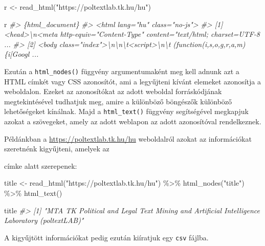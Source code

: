 \documentclass[
]{book}
\newenvironment{Shaded}{\begin{snugshade}}{\end{snugshade}}
\newcommand{\CommentTok}[1]{\textcolor[rgb]{0.56,0.35,0.01}{\textit{#1}}}
\newcommand{\FunctionTok}[1]{\textcolor[rgb]{0.00,0.00,0.00}{#1}}
\newcommand{\NormalTok}[1]{#1}
\newcommand{\OtherTok}[1]{\textcolor[rgb]{0.56,0.35,0.01}{#1}}
\newcommand{\SpecialCharTok}[1]{\textcolor[rgb]{0.00,0.00,0.00}{#1}}
\newcommand{\StringTok}[1]{\textcolor[rgb]{0.31,0.60,0.02}{#1}}
\begin{document}
\begin{Shaded}
\begin{Highlighting}[]

\NormalTok{r }\OtherTok{\textless{}{-}} \FunctionTok{read\_html}\NormalTok{(}\StringTok{"https://poltextlab.tk.hu/hu"}\NormalTok{)}

\NormalTok{r}
\CommentTok{\#\textgreater{} \{html\_document\}}
\CommentTok{\#\textgreater{} \textless{}html lang="hu" class="no{-}js"\textgreater{}}
\CommentTok{\#\textgreater{} [1] \textless{}head\textgreater{}\textbackslash{}n\textless{}meta http{-}equiv="Content{-}Type" content="text/html; charset=UTF{-}8 ...}
\CommentTok{\#\textgreater{} [2] \textless{}body class="index"\textgreater{}\textbackslash{}n\textbackslash{}n\textbackslash{}t\textless{}script\textgreater{}\textbackslash{}n\textbackslash{}t  (function(i,s,o,g,r,a,m)\{i[\textquotesingle{}Googl ...}
\end{Highlighting}
\end{Shaded}

Ezután a \texttt{html\_nodes()} függvény argumentumaként meg kell adnunk
azt a HTML címkét vagy CSS azonosítót, ami a legyűjteni kívánt elemeket
azonosítja a weboldalon. Ezeket az azonosítókat az adott weboldal
forráskódjának megtekintésével tudhatjuk meg, amire a különböző
böngészők különböző lehetőségeket kínálnak. Majd a \texttt{html\_text()}
függvény segítségével megkapjuk azokat a szövegeket, amely az adott
weblapon az adott azonosítóval rendelkeznek.

Példánkban a \url{https://poltextlab.tk.hu/hu} weboldalról azokat az
információkat szeretnénk kigyűjteni, amelyek az

címke alatt szerepenek:

\begin{Shaded}
\begin{Highlighting}[]

\NormalTok{title }\OtherTok{\textless{}{-}} \FunctionTok{read\_html}\NormalTok{(}\StringTok{"https://poltextlab.tk.hu/hu"}\NormalTok{) }\SpecialCharTok{\%\textgreater{}\%}
  \FunctionTok{html\_nodes}\NormalTok{(}\StringTok{"title"}\NormalTok{) }\SpecialCharTok{\%\textgreater{}\%}
  \FunctionTok{html\_text}\NormalTok{()}


\NormalTok{title}
\CommentTok{\#\textgreater{} [1] "MTA TK Political and Legal Text Mining and Artificial Intelligence Laboratory (poltextLAB)"}
\end{Highlighting}
\end{Shaded}

A kigyűjtött információkat pedig ezután kiíratjuk egy \texttt{csv}
fájlba.
\end{document}
